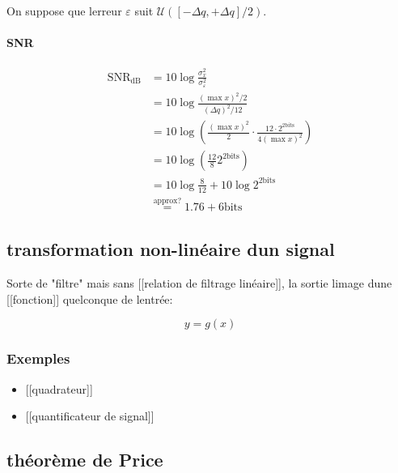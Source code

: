 \documentclass[
]{article}
\providecommand{\tightlist}{%
  \setlength{\itemsep}{0pt}\setlength{\parskip}{0pt}}
\begin{document}
On suppose que l\textquotesingle erreur \(\varepsilon\) suit
\(\mathcal{U}([ -\Delta q, +\Delta q ]/2)\).

\hypertarget{snr}{%
\paragraph{SNR}\label{snr}}

\begin{align*}
\operatorname{SNR}_{\text{dB}} &= 10 \log \frac{\sigma_x^2}{\sigma_\varepsilon^2} \\
&= 10 \log \frac{(\max x)^2 /2}{(\Delta q)^2 / 12} \\
&= 10 \log \left(  \frac{(\max x)^2}{2} \cdot \frac{12 \cdot 2^{\text{2bits}}}{4 (\max x)^2} \right) \\
&= 10 \log \left( \frac{12}{8}  2^{2\text{bits}} \right ) \\
&= 10 \log \frac{8}{12} + 10 \log 2^{2 \text{bits}} \\
&\stackrel{\text{approx?}}{=} 1.76 + 6\text{bits}
\end{align*}

\hypertarget{transformation-non-linuxe9aire-dun-signal}{%
\subsection{transformation non-linéaire d\textquotesingle un
signal}\label{transformation-non-linuxe9aire-dun-signal}}

Sorte de "filtre" mais sans {[}{[}relation de filtrage linéaire{]}{]},
la sortie l\textquotesingle image d\textquotesingle une
{[}{[}fonction{]}{]} quelconque de l\textquotesingle entrée:

\[
y = g(x)
\]

\hypertarget{exemples}{%
\subsubsection{Exemples}\label{exemples}}

\begin{itemize}
\tightlist
\item
  {[}{[}quadrateur{]}{]}
\item
  {[}{[}quantificateur de signal{]}{]}
\end{itemize}

\hypertarget{thuxe9oruxe8me-de-price}{%
\subsection{théorème de Price}\label{thuxe9oruxe8me-de-price}}
\end{document}
